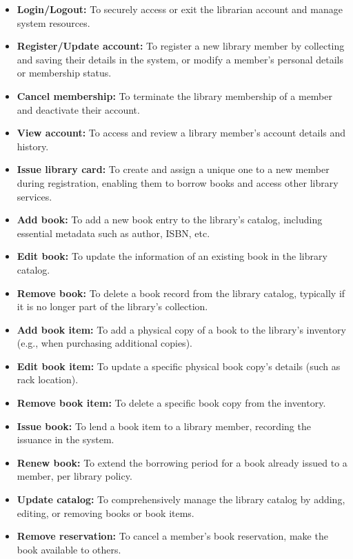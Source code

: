 \begin{itemize}
\item
\protect{}\label{PuHAINXkOLU4W-w1aaXOQ}
\textbf{Login/Logout:} To securely access or exit the librarian account and manage system resources.
\item
\protect{}\label{zFBoHDyK-UwvXqaMsmdk6}
\textbf{Register/Update account:} To register a new library member by collecting and saving their details in the system, or modify a member's personal details or membership status.
\item
\protect{}\label{CPzU4hfiMsc7WggwxDKH0}
\textbf{Cancel membership:} To terminate the library membership of a member and deactivate their account.
\item
\protect{}\label{1z0YHRqgD6DIZYxb2LL4p}
\textbf{View account:} To access and review a library member's account details and history.
\item
\protect{}\label{sf7Qsw03sutXh8CkjcPPg}
\textbf{Issue library card:} To create and assign a unique one to a new member during registration, enabling them to borrow books and access other library services.
\item
\protect{}\label{udX0jHDgNPNaPzIXTQCFJ}
\textbf{Add book:} To add a new book entry to the library's catalog, including essential metadata such as author, ISBN, etc.
\item
\protect{}\label{CFjrrtxtBN3H2hgGtGCx7}
\textbf{Edit book:} To update the information of an existing book in the library catalog.
\item
\protect{}\label{MxBd-qBOMxX5MOynyeRxQ}
\textbf{Remove book:} To delete a book record from the library catalog, typically if it is no longer part of the library's collection.
\item
\protect{}\label{qIfGrHvMbJufw7kbMDtd3}
\textbf{Add book item:} To add a physical copy of a book to the library's inventory (e.g., when purchasing additional copies).
\item
\protect{}\label{bkyKCC5m83ZPmqpsQDNT-}
\textbf{Edit book item:} To update a specific physical book copy's details (such as rack location).
\item
\protect{}\label{LjUkbVd41-jhQ9TYOFwai}
\textbf{Remove book item:} To delete a specific book copy from the inventory.
\item
\protect{}\label{wzLMk-joSmW2q38IUjdO-}
\textbf{Issue book:} To lend a book item to a library member, recording the issuance in the system.
\item
\protect{}\label{IYSxY3XYk95Z021uV7t_G}
\textbf{Renew book:} To extend the borrowing period for a book already issued to a member, per library policy.
\item
\protect{}\label{Xch7XVzuG1MJ6t4lKXXfn}
\textbf{Update catalog:} To comprehensively manage the library catalog by adding, editing, or removing books or book items.
\item
\protect{}\label{dyt_mHzk8Kyo9jyOa1RHX}
\textbf{Remove reservation:} To cancel a member's book reservation, make the book available to others.
\end{itemize}

